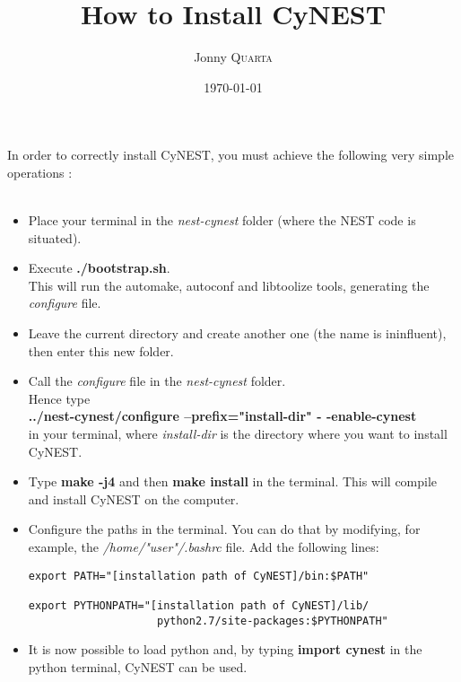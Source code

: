 \documentclass{article}
\title{How to Install CyNEST} %
\author{Jonny \textsc{Quarta}} %
\date{\today} %
\begin{document}
\maketitle %


\setlength\parindent{0pt} %

\renewcommand{\labelenumi}{\alph{enumi}.} %



In order to correctly install CyNEST, you must achieve the following very simple operations :
\\ \\
\begin{itemize}
\item Place your terminal in the \emph{nest-cynest} folder (where the NEST code is situated).

\item Execute \textbf{./bootstrap.sh}.\\ This will run the automake, autoconf and libtoolize tools, generating the \emph{configure} file.

\item Leave the current directory and create another one (the name is ininfluent), then enter this new folder.

\item Call the \emph{configure} file in the \emph{nest-cynest} folder.\\Hence type \\ \textbf{../nest-cynest/configure --prefix="install-dir" - -enable-cynest}\\ in your terminal, where \emph{install-dir} is the directory where you want to install CyNEST.

\item Type \textbf{make -j4} and then \textbf{make install} in the terminal. This will compile and install CyNEST on the computer. 

\item Configure the paths in the terminal. You can do that by modifying, for example, the \emph{/home/"user"/.bashrc} file. Add the following lines:
\begin{verbatim}
export PATH="[installation path of CyNEST]/bin:$PATH"

export PYTHONPATH="[installation path of CyNEST]/lib/
                    python2.7/site-packages:$PYTHONPATH"
\end{verbatim}

\item It is now possible to load python and, by typing \textbf{import cynest} in the python terminal, CyNEST can be used.


\end{itemize}
\end{document}
